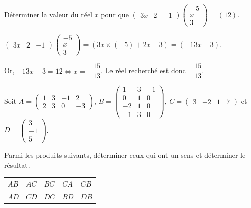 \documentclass[11pt,fleqn]{book} %
\begin{document}
\begin{exercise}[topic=mat02]Déterminer la valeur du réel $x$ pour que $\begin{pmatrix} 3x & 2 & -1 \end{pmatrix} \begin{pmatrix} -5 \\ x \\ 3\end{pmatrix} = (12)$.\end{exercise}

\begin{solution}\(\begin{pmatrix} 3x & 2 & -1 \end{pmatrix} \begin{pmatrix} -5 \\ x \\ 3\end{pmatrix} = (3x \times(-5) +2x -3) = (-13x-3)\).

Or, \(-13x-3= 12 \Leftrightarrow x = -\dfrac{15}{13}\). Le réel recherché est donc \(-\dfrac{15}{13}\).\end{solution}

\begin{exercise}[topic=mat02]Soit $A=\begin{pmatrix} 1 & 3 & -1 & 2 \\ 2 & 3 & 0 & -3\end{pmatrix}$, $B = \begin{pmatrix} 1 & 3 & -1 \\ 0 & 1 & 0 \\ -2 & 1 & 0 \\ -1 & 3 & 0\end{pmatrix}$, $C= \begin{pmatrix} 3 & -2 & 1 & 7 \end{pmatrix}$ et $D = \begin{pmatrix} 3 \\ -1 \\ 5\end{pmatrix}$.

Parmi les produits suivants, déterminer ceux qui ont un sens et déterminer le résultat.

\begin{tabularx}{\linewidth}{XXXXX}
$AB$ & $AC$ & $BC$ & $CA$ & $CB$  \\
$AD$ & $CD$ & $DC$ & $BD$ & $DB$\end{tabularx}\end{exercise}
\end{document}
